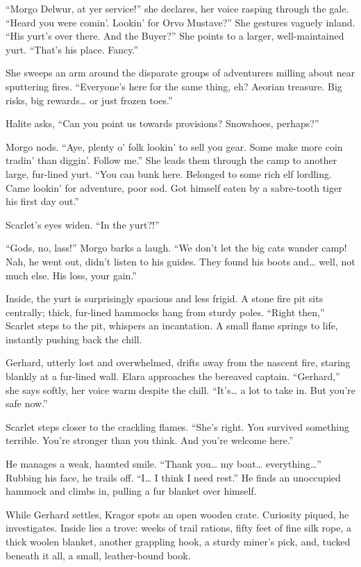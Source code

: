 \documentclass[
  letterpaper,12pt,twoside,twocolumn,openany,
  nodeprecatedcode,bg=full]{dndbook}
\begin{document}
``Morgo Delwur, at yer service!'' she declares, her voice rasping
through the gale. ``Heard you were comin'. Lookin' for Orvo Mustave?''
She gestures vaguely inland. ``His yurt's over there. And the Buyer?''
She points to a larger, well-maintained yurt. ``That's his place.
Fancy.''

She sweeps an arm around the disparate groups of adventurers milling
about near sputtering fires. ``Everyone's here for the same thing, eh?
Aeorian treasure. Big risks, big rewards\ldots{} or just frozen toes.''

Halite asks, ``Can you point us towards provisions? Snowshoes,
perhaps?''

Morgo nods. ``Aye, plenty o' folk lookin' to sell you gear. Some make
more coin tradin' than diggin'. Follow me.'' She leads them through the
camp to another large, fur-lined yurt. ``You can bunk here. Belonged to
some rich elf lordling. Came lookin' for adventure, poor sod. Got
himself eaten by a sabre-tooth tiger his first day out.''

Scarlet's eyes widen. ``In the yurt?!''

``Gods, no, lass!'' Morgo barks a laugh. ``We don't let the big cats
wander camp! Nah, he went out, didn't listen to his guides. They found
his boots and\ldots{} well, not much else. His loss, your gain.''

Inside, the yurt is surprisingly spacious and less frigid. A stone fire
pit sits centrally; thick, fur-lined hammocks hang from sturdy poles.
``Right then,'' Scarlet steps to the pit, whispers an incantation. A
small flame springs to life, instantly pushing back the chill.

Gerhard, utterly lost and overwhelmed, drifts away from the nascent
fire, staring blankly at a fur-lined wall. Elara approaches the bereaved
captain. ``Gerhard,'' she says softly, her voice warm despite the chill.
``It's\ldots{} a lot to take in. But you're safe now.''

Scarlet steps closer to the crackling flames. ``She's right. You
survived something terrible. You're stronger than you think. And you're
welcome here.''

He manages a weak, haunted smile. ``Thank you\ldots{} my boat\ldots{}
everything\ldots{}'' Rubbing his face, he trails off. ``I\ldots{} I
think I need rest.'' He finds an unoccupied hammock and climbs in,
pulling a fur blanket over himself.

While Gerhard settles, Kragor spots an open wooden crate. Curiosity
piqued, he investigates. Inside lies a trove: weeks of trail rations,
fifty feet of fine silk rope, a thick woolen blanket, another grappling
hook, a sturdy miner's pick, and, tucked beneath it all, a small,
leather-bound book.
\end{document}
